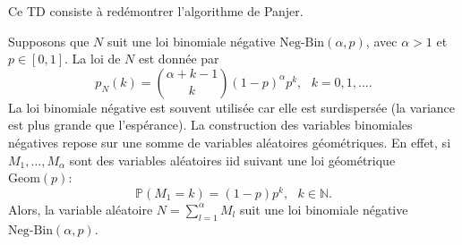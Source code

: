 \documentclass[12pt]{exam}
\begin{document}
Ce TD consiste à redémontrer l'algorithme de Panjer.
\begin{questions}
\question Supposons que $N$ suit une loi binomiale négative $\text{Neg-Bin}(\alpha,p)$, avec $\alpha>1$ et $p\in[0,1]$. La loi de $N$ est donnée par 
\begin{equation*}
p_N(k)=\binom{\alpha+k-1}{k}(1-p)^{\alpha}p^{k},\text{ }k=0,1,\ldots.
\end{equation*}
La loi binomiale négative est souvent utilisée car elle est surdispersée (la variance est plus grande que l'espérance). La construction des variables binomiales négatives repose sur une somme de variables aléatoires géométriques. En effet, si $M_1,\ldots,M_\alpha$ sont des variables aléatoires iid suivant une loi géométrique $\text{Geom}(p)$: 
\begin{equation*}
\mathbb{P}(M_1=k)=(1-p)p^{k},\text{ }k\in\mathbb{N}.
\end{equation*}
Alors, la variable aléatoire $N=\sum_{l=1}^{\alpha}M_l$ suit une loi binomiale négative $\text{Neg-Bin}(\alpha,p)$. 
\end{questions}
\end{document}
